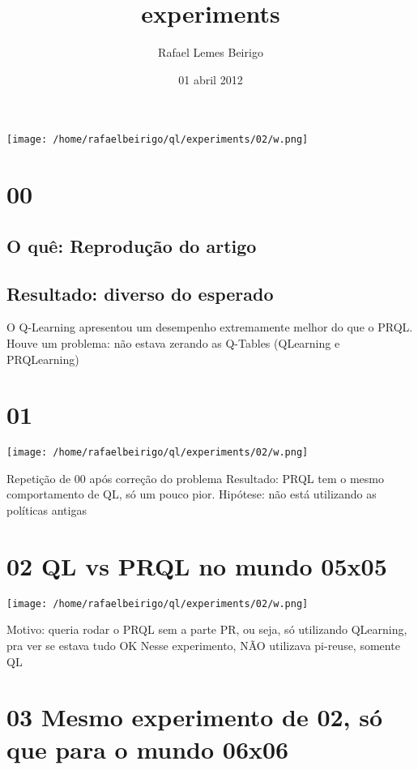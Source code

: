 \documentclass[11pt]{article}
\title{experiments}
\author{Rafael Lemes Beirigo}
\date{01 abril 2012}
\begin{document}
\maketitle

\setcounter{tocdepth}{3}
\tableofcontents
\vspace*{1cm}
\centerline{\texttt{[image: /home/rafaelbeirigo/ql/experiments/02/w.png]}}


\section{00}
\label{sec-1}


\subsection{O quê: Reprodução do artigo}
\label{sec-1.1}

\subsection{Resultado: diverso do esperado}
\label{sec-1.2}

   O Q-Learning apresentou um desempenho extremamente melhor do que o PRQL.
   Houve um problema: não estava zerando as Q-Tables (QLearning e PRQLearning)
         

\section{01}
\label{sec-2}

\centerline{\texttt{[image: /home/rafaelbeirigo/ql/experiments/02/w.png]}}

Repetição de 00 após correção do problema
Resultado: PRQL tem o mesmo comportamento de QL, só um pouco pior.
Hipótese: não está utilizando as políticas antigas


\section{02 QL vs PRQL no mundo 05x05}
\label{sec-3}

\centerline{\texttt{[image: /home/rafaelbeirigo/ql/experiments/02/w.png]}}

Motivo: queria rodar o PRQL sem a parte PR, ou seja, só utilizando
QLearning, pra ver se estava tudo OK
Nesse experimento, NÃO utilizava pi-reuse, somente QL


\section{03 Mesmo experimento de 02, só que para o mundo 06x06}
\label{sec-4}
\end{document}
